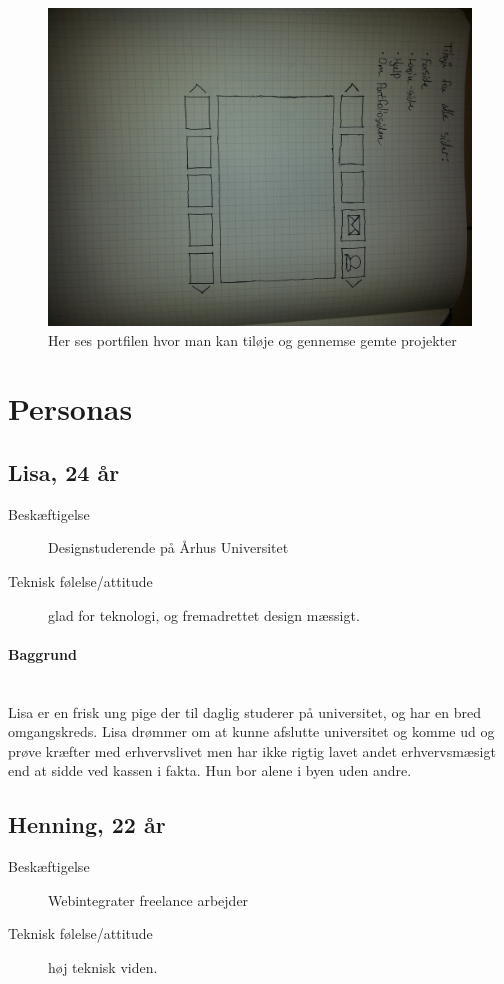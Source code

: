 \documentclass[a4paper,titlepage,fleqn,12pt]{article}
\begin{document}
\begin{figure}[H]
\includegraphics[width=\textwidth]{mainside.jpg}
\caption{Her ses portfilen hvor man kan tiløje og gennemse gemte projekter}
\end{figure}

\section{Personas}
\subsection{Lisa, 24 år}
\begin{description}
	\item[Beskæftigelse] Designstuderende på Århus Universitet
	\item[Teknisk følelse/attitude] glad for teknologi, og fremadrettet design mæssigt.
\end{description}
\paragraph{Baggrund}\hfill\\Lisa er en frisk ung pige der til daglig studerer på universitet, og har en bred omgangskreds. Lisa drømmer om at kunne afslutte universitet og komme ud og prøve kræfter med erhvervslivet men har ikke rigtig lavet andet erhvervsmæsigt end at sidde ved kassen i fakta. Hun bor alene i byen uden andre.

\subsection{Henning, 22 år}
\begin{description}
	\item[Beskæftigelse] Webintegrater freelance arbejder
	\item[Teknisk følelse/attitude] høj teknisk viden.
\end{description}
\end{document}
